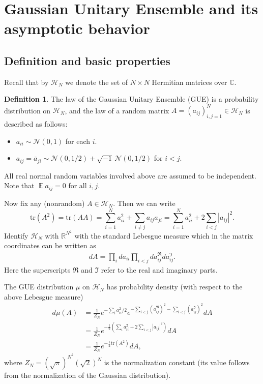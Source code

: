 \documentclass[letterpaper,11pt,oneside,reqno]{amsart}
\numberwithin{equation}{section}
\DeclareMathOperator{\EE}{\mathbb{E}}
\theoremstyle{definition}
\newtheorem{definition}[proposition]{Definition}
\begin{document}


\section{Gaussian Unitary Ensemble and its asymptotic behavior} %
\label{sec:gaussian_unitary_ensemble}

\subsection{Definition and basic properties} %
\label{sub:definition_and_basic_properties}

Recall that by $\mathcal H_N$ we denote the set of $N \times N$ Hermitian matrices over $\mathbb{C}$. 

\begin{definition}
  The law of the Gaussian Unitary Ensemble (GUE) is 
  a probability distribution on $\mathcal H_N$, and the law of 
  a random matrix $A=(a_{ij})_{i,j=1}^N\in\mathcal H_N$ is described as follows:
  \begin{itemize}
    \item $a_{ii} \sim \mathcal{N}(0,1)$ for each $i$.
    \item $a_{ij}=\overline{a}_{ji}\sim \mathcal{N}(0,1/2)+ \sqrt{-1}\, \mathcal{N}(0,1/2)$ for $i<j$.
  \end{itemize}
  All real normal random variables involved above are assumed to be independent.
  Note that $\EE a_{ij}=0$ for all $i,j$.
\end{definition}

Now fix any (nonrandom) $A\in \mathcal H_N$. Then we can write
\begin{equation*}
  \mathrm{tr}(A^2)=\mathrm{tr}(AA)=\sum_{i=1}^N a_{ii}^2+\sum_{i\neq j} a_{ij}a_{ji}=\sum_{i=1}^N a_{ii}^2+2\sum_{i<j} |a_{ij}|^2.
\end{equation*}
Identify $\mathcal H_N$ with $\mathbb{R}^{N^2}$ with the standard Lebesgue measure
which in the matrix coordinates can be written as
\begin{align*}
  dA = \prod_i d a_{ii} \prod_{i<j} da_{ij}^{\Re} da_{ij}^\Im.
\end{align*}
Here the superscripts $\Re$ and $\Im$ refer to the real and imaginary parts.

The GUE distribution $\mu$ on $\mathcal H_N$
has probability density (with respect to the above Lebesgue measure)
\begin{align*}
  d\mu(A) &=\frac{1}{Z_N}e^{-\sum_{i}a_{ii}^2/2}
  e^{-\sum_{i<j}(a_{ij}^{\Re})^2-\sum_{i<j}(a_{ij}^{\Im})^2} dA \\
  &= \frac{1}{Z_N}e^{-\frac{1}{2}(\sum_i a_{ii}^2+2\sum_{i<j}|a_{ij}|^2)} dA\\
  &= \frac{1}{Z_N} e^{-\frac{1}{2} \mathrm{tr}(A^2)} dA,
\end{align*}
where $Z_N=(\sqrt{\pi})^{N^2} (\sqrt{2})^N$ is the normalization constant (its value
follows from the normalization of the Gaussian distribution).
\end{document}
